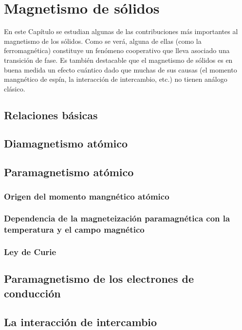 \chapter{Magnetismo de sólidos} \label{Ch:10}

En este Capítulo se estudian algunas de las contribuciones más importantes al magnetismo de los sólidos. Como se verá, alguna de ellas (como la ferromagnética) constituye un fenómeno cooperativo que lleva asociado una transición de fase. Es también destacable que el magnetismo de sólidos es en buena medida un efecto cuántico dado que muchas de sus causas (el momento mangnético de espín, la interacción de intercambio, etc.) no tienen análogo clásico.

\section{Relaciones básicas}

\section{Diamagnetismo atómico}

\section{Paramagnetismo atómico}

\subsection{Origen del momento mangnético atómico}

\subsection[Dependencia de la magnetización respecto $\vec{\Bn}$ y $T$]{Dependencia de la magneteización paramagnética con la temperatura y el campo magnético}

\subsection{Ley de Curie}

\section{Paramagnetismo de los electrones de conducción}

\section{La interacción de intercambio}

